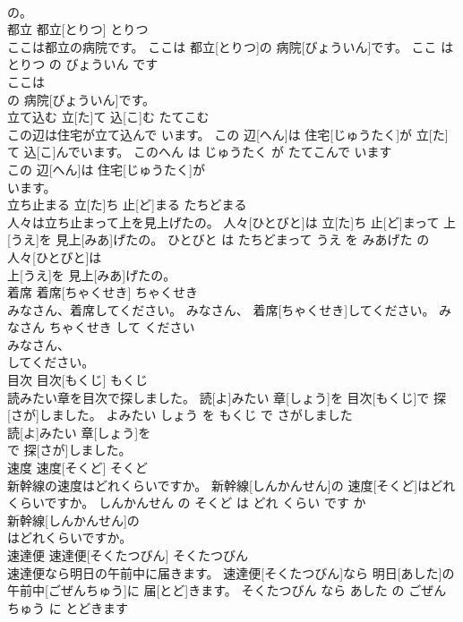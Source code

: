 \documentclass[8pt]{extreport}
\begin{document}
\begin{CJK}{UTF8}{min}
\\	の。			
\\	都立	都立[とりつ]	とりつ	
\\	ここは都立の病院です。	ここは 都立[とりつ]の 病院[びょういん]です。	ここ は とりつ の びょういん です	
\\	ここは
\\	の 病院[びょういん]です。			
\\	立て込む	立[た]て 込[こ]む	たてこむ	
\\	この辺は住宅が立て込んで います。	この 辺[へん]は 住宅[じゅうたく]が 立[た]て 込[こ]んでいます。	このへん は じゅうたく が たてこんで います	
\\	この 辺[へん]は 住宅[じゅうたく]が
\\	います。			
\\	立ち止まる	立[た]ち 止[ど]まる	たちどまる	
\\	人々は立ち止まって上を見上げたの。	人々[ひとびと]は 立[た]ち 止[ど]まって 上[うえ]を 見上[みあ]げたの。	ひとびと は たちどまって うえ を みあげた の	
\\	人々[ひとびと]は
\\	上[うえ]を 見上[みあ]げたの。			
\\	着席	着席[ちゃくせき]	ちゃくせき	
\\	みなさん、着席してください。	みなさん、 着席[ちゃくせき]してください。	みなさん ちゃくせき して ください	
\\	みなさん、
\\	してください。			
\\	目次	目次[もくじ]	もくじ	
\\	読みたい章を目次で探しました。	読[よ]みたい 章[しょう]を 目次[もくじ]で 探[さが]しました。	よみたい しょう を もくじ で さがしました	
\\	読[よ]みたい 章[しょう]を
\\	で 探[さが]しました。			
\\	速度	速度[そくど]	そくど	
\\	新幹線の速度はどれくらいですか。	新幹線[しんかんせん]の 速度[そくど]はどれくらいですか。	しんかんせん の そくど は どれ くらい です か	
\\	新幹線[しんかんせん]の
\\	はどれくらいですか。			
\\	速達便	速達便[そくたつびん]	そくたつびん	
\\	速達便なら明日の午前中に届きます。	速達便[そくたつびん]なら 明日[あした]の 午前中[ごぜんちゅう]に 届[とど]きます。	そくたつびん なら あした の ごぜんちゅう に とどきます	

\end{CJK}
\end{document}
